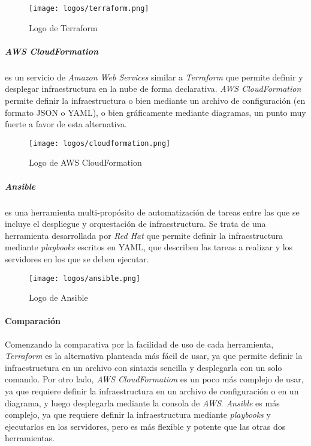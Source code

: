 \begin{figure}[H]
	\centering
	\texttt{[image: logos/terraform.png]}
	\caption{Logo de Terraform~\textregistered}
	\label{fig:terraform}
\end{figure}

\subparagraph{AWS CloudFormation} es un servicio de \textit{Amazon Web Services}
similar a \textit{Terraform} que permite definir y desplegar infraestructura en
la nube de forma declarativa. \textit{AWS CloudFormation} permite definir la
infraestructura o bien mediante un archivo de configuración (en formato JSON o
YAML), o bien gráficamente mediante diagramas, un punto muy fuerte a favor de
esta alternativa.

\begin{figure}[H]
	\centering
	\texttt{[image: logos/cloudformation.png]}
	\caption{Logo de AWS CloudFormation~\textregistered}
	\label{fig:cloudformation}
\end{figure}

\subparagraph{Ansible} es una herramienta multi-propósito de automatización de tareas
entre las que se incluye el despliegue y orquestación de infraestructura. Se
trata de una herramienta desarrollada por \textit{Red Hat} que permite definir
la infraestructura mediante \textit{playbooks} escritos en YAML, que describen
las tareas a realizar y los servidores en los que se deben ejecutar.

\begin{figure}[H]
	\centering
	\texttt{[image: logos/ansible.png]}
	\caption{Logo de Ansible~\textregistered}
	\label{fig:ansible}
\end{figure}

\paragraph{Comparación}
Comenzando la comparativa por la facilidad de uso de cada herramienta,
\textit{Terraform} es la alternativa planteada más fácil de usar, ya que permite
definir la infraestructura en un archivo con sintaxis sencilla y desplegarla con
un solo comando. Por otro lado, \textit{AWS CloudFormation} es un poco más
complejo de usar, ya que requiere definir la infraestructura en un archivo de
configuración o en un diagrama, y luego desplegarla mediante la consola de
\textit{AWS}. \textit{Ansible} es más complejo, ya que requiere definir
la infraestructura mediante \textit{playbooks} y ejecutarlos en los servidores,
pero es más flexible y potente que las otras dos herramientas.

